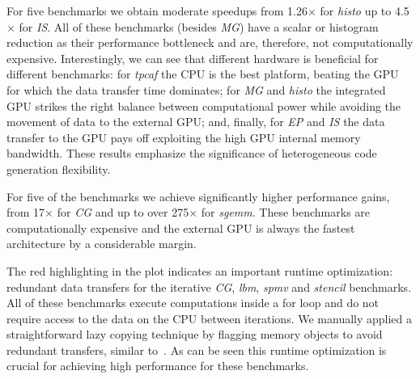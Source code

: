 \addtolength{\tabcolsep}{+.25em}

For five benchmarks we obtain moderate speedups from 1.26$\times$ for \emph{histo} up to 4.5$\times$ for \emph{IS}.
All of these benchmarks (besides \emph{MG}) have a scalar or histogram reduction as their performance bottleneck and are, therefore, not computationally expensive.
Interestingly, we can see that different hardware is beneficial for different benchmarks:
for \emph{tpcaf}  the CPU is the best platform, beating the GPU  for which the data transfer time dominates;
for \emph{MG} and \emph{histo} the integrated GPU strikes the right balance between computational power while avoiding the movement of data to the external GPU;
and, finally, for \emph{EP} and \emph{IS} the data transfer to the GPU pays off exploiting the high GPU internal memory bandwidth.
These results emphasize the significance of heterogeneous code generation
flexibility.

For five of the benchmarks we achieve significantly higher performance gains, from 17$\times$ for \emph{CG} and up to over 275$\times$ for \emph{sgemm}.
These benchmarks are computationally expensive and the external GPU is always the fastest architecture by a considerable margin.

The red highlighting in the plot indicates an important runtime optimization:
redundant data transfers for the iterative \emph{CG}, \emph{lbm}, \emph{spmv} and \emph{stencil} benchmarks.
All of these benchmarks execute computations inside a for loop and do not require access to the data on the CPU between iterations.
We manually applied a straightforward lazy copying technique by flagging memory objects to avoid redundant transfers, similar to~\cite{jablin11automatic}.
As can be seen this runtime optimization is crucial for achieving high performance for these benchmarks.

